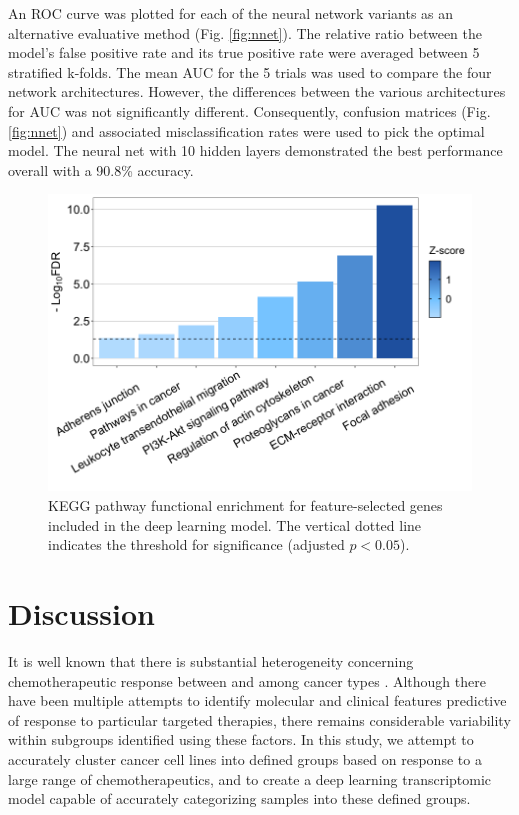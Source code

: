 \documentclass[10pt, letterpaper, twocolumn]{article}
\begin{document}
An ROC curve was plotted for each of the neural network variants as an alternative evaluative method (Fig. \ref{fig:nnet}). The relative ratio between the model’s false positive rate and its true positive rate were averaged between 5 stratified k-folds. The mean AUC for the 5 trials was used to compare the four network architectures. However, the differences between the various architectures for AUC was not significantly different. Consequently, confusion matrices (Fig. \ref{fig:nnet}) and associated misclassification rates were used to pick the optimal model. The neural net with 10 hidden layers demonstrated the best performance overall with a 90.8\% accuracy.

\begin{figure}[t]
	\centering
	\includegraphics[width=\columnwidth]{Figures/kegg.png}
	\caption{KEGG pathway functional enrichment for feature-selected genes included in the deep learning model. The vertical dotted line indicates the threshold for significance (adjusted $p < 0.05$).}
	\label{fig:kegg}
\end{figure}


\section{Discussion}
It is well known that there is substantial heterogeneity concerning chemotherapeutic response between and among cancer types \cite{hetero, plasticity}. Although there have been multiple attempts to identify molecular and clinical features predictive of response to particular targeted therapies, there remains considerable variability within subgroups identified using these factors. In this study, we attempt to accurately cluster cancer cell lines into defined groups based on response to a large range of chemotherapeutics, and to create a deep learning transcriptomic model capable of accurately categorizing samples into these defined groups.
\end{document}
